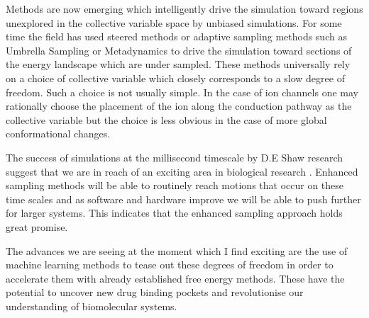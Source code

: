Methods are now emerging which intelligently drive the simulation toward regions unexplored in the collective variable space by unbiased simulations. For some time the field has used steered methods or adaptive sampling methods such as Umbrella Sampling or Metadynamics to drive the simulation toward sections of the energy landscape which are under sampled. These methods universally rely on a choice of collective variable which closely corresponds to a slow degree of freedom. Such a choice is not usually simple. In the case of ion channels one may rationally choose the placement of the ion along the conduction pathway as the collective variable but the choice is less obvious in the case of more global conformational changes.

The success of simulations at the millisecond timescale by D.E Shaw research suggest that we are in reach of an exciting area in biological research \cite{lindorff-larsen2016}. Enhanced sampling methods will be able to routinely reach motions that occur on these time scales and as software and hardware improve we will be able to push further for larger systems. This indicates that the enhanced sampling approach holds great promise.

The advances we are seeing at the moment which I find exciting are the use of machine learning methods to tease out these degrees of freedom in order to accelerate them with already established free energy methods. These have the potential to uncover new drug binding pockets and revolutionise our understanding of biomolecular systems. 


